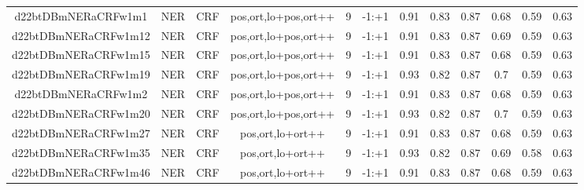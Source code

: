 \documentclass[a4paper]{article}
\begin{document}
\begin{landscape}
\begin{center}
\begin{tabular}{ |c|c|c|c|c|c|c|c|c|c|c|c|}
 	
 
 	
 		
 		\small{ d22btDBmNERaCRFw1m1 } & NER & CRF & pos,ort,lo+pos,ort++  &  9 &  -1:+1  &  0.91 & 0.83 & 0.87  &  0.68 & 0.59 & 0.63 \\
 		

 	
 
 	
 		
 		\small{ d22btDBmNERaCRFw1m12 } & NER & CRF & pos,ort,lo+pos,ort++  &  9 &  -1:+1  &  0.91 & 0.83 & 0.87  &  0.69 & 0.59 & 0.63 \\
 		

 	
 
 	
 		
 		\small{ d22btDBmNERaCRFw1m15 } & NER & CRF & pos,ort,lo+pos,ort++  &  9 &  -1:+1  &  0.91 & 0.83 & 0.87  &  0.68 & 0.59 & 0.63 \\
 		

 	
 
 	
 		
 		\small{ d22btDBmNERaCRFw1m19 } & NER & CRF & pos,ort,lo+pos,ort++  &  9 &  -1:+1  &  0.93 & 0.82 & 0.87  &  0.7 & 0.59 & 0.63 \\
 		

 	
 
 	
 		
 		\small{ d22btDBmNERaCRFw1m2 } & NER & CRF & pos,ort,lo+pos,ort++  &  9 &  -1:+1  &  0.91 & 0.83 & 0.87  &  0.68 & 0.59 & 0.63 \\
 		

 	
 
 	
 		
 		\small{ d22btDBmNERaCRFw1m20 } & NER & CRF & pos,ort,lo+pos,ort++  &  9 &  -1:+1  &  0.93 & 0.82 & 0.87  &  0.7 & 0.59 & 0.63 \\
 		

 	
 
 	
 		
 		\small{ d22btDBmNERaCRFw1m27 } & NER & CRF & pos,ort,lo+ort++  &  9 &  -1:+1  &  0.91 & 0.83 & 0.87  &  0.68 & 0.59 & 0.63 \\
 		

 	
 
 	
 		
 		\small{ d22btDBmNERaCRFw1m35 } & NER & CRF & pos,ort,lo+ort++  &  9 &  -1:+1  &  0.93 & 0.82 & 0.87  &  0.69 & 0.58 & 0.63 \\
 		

 	
 
 	
 		
 		\small{ d22btDBmNERaCRFw1m46 } & NER & CRF & pos,ort,lo+ort++  &  9 &  -1:+1  &  0.91 & 0.83 & 0.87  &  0.68 & 0.59 & 0.63 \\
 		


\end{tabular}
\end{center}
\end{landscape}
\end{document}
